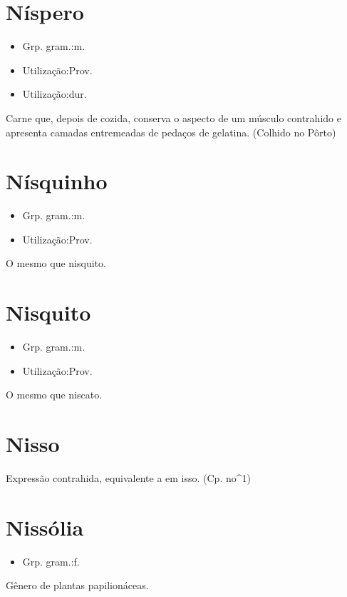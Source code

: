 \section{Níspero}
\begin{itemize}
\item {Grp. gram.:m.}
\end{itemize}
\begin{itemize}
\item {Utilização:Prov.}
\end{itemize}
\begin{itemize}
\item {Utilização:dur.}
\end{itemize}
Carne que, depois de cozida, conserva o aspecto de um músculo contrahido e apresenta camadas entremeadas de pedaços de gelatina. (Colhido no Pôrto)
\section{Nísquinho}
\begin{itemize}
\item {Grp. gram.:m.}
\end{itemize}
\begin{itemize}
\item {Utilização:Prov.}
\end{itemize}
O mesmo que \textunderscore nisquito\textunderscore .
\section{Nisquito}
\begin{itemize}
\item {Grp. gram.:m.}
\end{itemize}
\begin{itemize}
\item {Utilização:Prov.}
\end{itemize}
O mesmo que \textunderscore niscato\textunderscore .
\section{Nisso}
Expressão contrahida, equivalente a \textunderscore em isso\textunderscore .
(Cp. \textunderscore no\textunderscore ^1)
\section{Nissólia}
\begin{itemize}
\item {Grp. gram.:f.}
\end{itemize}
Gênero de plantas papilionáceas.
